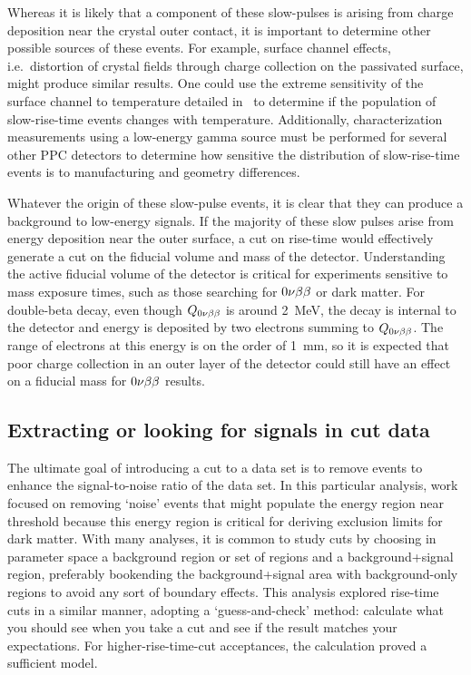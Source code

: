 Whereas it is likely that a component of these slow-pulses is arising from charge deposition near the crystal outer contact, it is important to determine other possible sources of these events.  For example, surface channel effects, i.e.~distortion of crystal fields through charge collection on the passivated surface, might produce similar results.  One could use the extreme sensitivity of the surface channel to temperature detailed in~\cite{Hull1995488} to determine if the population of slow-rise-time events changes with temperature.  Additionally, characterization measurements using a low-energy gamma source must be performed for several other PPC detectors to determine how sensitive the distribution of slow-rise-time events is to manufacturing and geometry differences.  

Whatever the origin of these slow-pulse events, it is clear that they can produce a background to low-energy signals.  If the majority of these slow pulses arise from energy deposition near the outer surface, a cut on rise-time would effectively generate a cut on the fiducial volume and mass of the detector.  Understanding the active fiducial volume of the detector is critical for experiments sensitive to mass exposure times, such as those searching for $0 \nu \beta \beta$ or dark matter.  For double-beta decay, even though $Q_{0 \nu \beta \beta}$ is around 2~MeV, the decay is internal to the detector and energy is deposited by two electrons summing to $Q_{0 \nu \beta \beta}$.  The range of electrons at this energy is on the order of 1~mm, so it is expected that poor charge collection in an outer layer of the detector could still have an effect on a fiducial mass for $0 \nu \beta \beta$ results.  


	\subsection{Extracting or looking for signals in cut data}
	\label{sec:BeGeLowEnergyFeatures}
	
	The ultimate goal of introducing a cut to a data set is to remove events to enhance the signal-to-noise ratio of the data set.  In this particular analysis, work focused on removing `noise' events that might populate the energy region near threshold because this energy region is critical for deriving exclusion limits for dark matter.  With many analyses, it is common to study cuts by choosing in parameter space a background region or set of regions and a background+signal region, preferably bookending the background+signal area with background-only regions to avoid any sort of boundary effects.   This analysis explored rise-time cuts in a similar manner, adopting a `guess-and-check' method: calculate what you should see when you take a cut and see if the result matches your expectations.  For higher-rise-time-cut acceptances, the calculation proved a sufficient model.  
	
